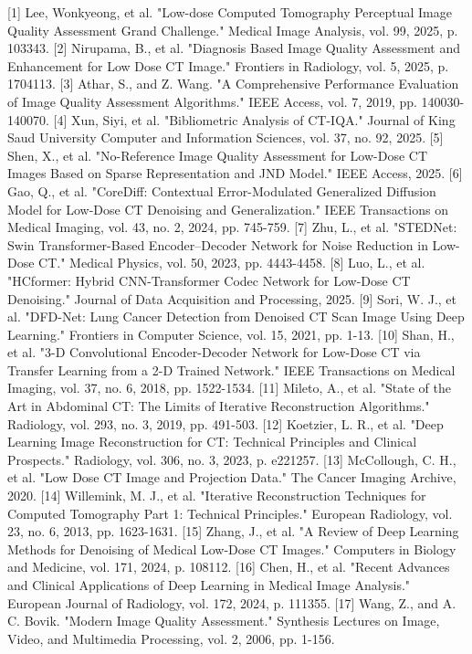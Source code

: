 [1] Lee, Wonkyeong, et al. "Low-dose Computed Tomography Perceptual Image Quality Assessment Grand Challenge." Medical Image Analysis, vol. 99, 2025, p. 103343.
[2] Nirupama, B., et al. "Diagnosis Based Image Quality Assessment and Enhancement for Low Dose CT Image." Frontiers in Radiology, vol. 5, 2025, p. 1704113.
[3] Athar, S., and Z. Wang. "A Comprehensive Performance Evaluation of Image Quality Assessment Algorithms." IEEE Access, vol. 7, 2019, pp. 140030-140070.
[4] Xun, Siyi, et al. "Bibliometric Analysis of CT-IQA." Journal of King Saud University Computer and Information Sciences, vol. 37, no. 92, 2025.
[5] Shen, X., et al. "No-Reference Image Quality Assessment for Low-Dose CT Images Based on Sparse Representation and JND Model." IEEE Access, 2025.
[6] Gao, Q., et al. "CoreDiff: Contextual Error-Modulated Generalized Diffusion Model for Low-Dose CT Denoising and Generalization." IEEE Transactions on Medical Imaging, vol. 43, no. 2, 2024, pp. 745-759.
[7] Zhu, L., et al. "STEDNet: Swin Transformer-Based Encoder–Decoder Network for Noise Reduction in Low-Dose CT." Medical Physics, vol. 50, 2023, pp. 4443-4458.
[8] Luo, L., et al. "HCformer: Hybrid CNN-Transformer Codec Network for Low-Dose CT Denoising." Journal of Data Acquisition and Processing, 2025.
[9] Sori, W. J., et al. "DFD-Net: Lung Cancer Detection from Denoised CT Scan Image Using Deep Learning." Frontiers in Computer Science, vol. 15, 2021, pp. 1-13.
[10] Shan, H., et al. "3-D Convolutional Encoder-Decoder Network for Low-Dose CT via Transfer Learning from a 2-D Trained Network." IEEE Transactions on Medical Imaging, vol. 37, no. 6, 2018, pp. 1522-1534.
[11] Mileto, A., et al. "State of the Art in Abdominal CT: The Limits of Iterative Reconstruction Algorithms." Radiology, vol. 293, no. 3, 2019, pp. 491-503.
[12] Koetzier, L. R., et al. "Deep Learning Image Reconstruction for CT: Technical Principles and Clinical Prospects." Radiology, vol. 306, no. 3, 2023, p. e221257.
[13] McCollough, C. H., et al. "Low Dose CT Image and Projection Data." The Cancer Imaging Archive, 2020.
[14] Willemink, M. J., et al. "Iterative Reconstruction Techniques for Computed Tomography Part 1: Technical Principles." European Radiology, vol. 23, no. 6, 2013, pp. 1623-1631.
[15] Zhang, J., et al. "A Review of Deep Learning Methods for Denoising of Medical Low-Dose CT Images." Computers in Biology and Medicine, vol. 171, 2024, p. 108112.
[16] Chen, H., et al. "Recent Advances and Clinical Applications of Deep Learning in Medical Image Analysis." European Journal of Radiology, vol. 172, 2024, p. 111355.
[17] Wang, Z., and A. C. Bovik. "Modern Image Quality Assessment." Synthesis Lectures on Image, Video, and Multimedia Processing, vol. 2, 2006, pp. 1-156.
